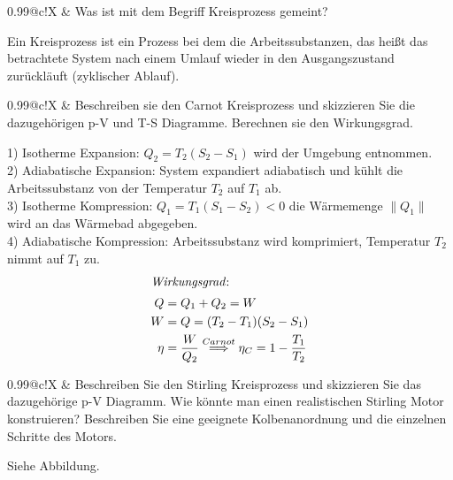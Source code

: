 \documentclass[a4paper,12pt]{scrartcl}
\makeatletter
\newcounter{qc}\setcounter{qc}{1}
\newenvironment{fshaded}{
\def\FrameCommand{\fcolorbox{framecolor}{shadecolor}}
\MakeFramed {\FrameRestore}}
{\endMakeFramed}
\def\frage#1{
\begin{fshaded}
\noindent
\begin{tabularx}{0.99\textwidth}{@{}c!{\color{framecolor}\vline}X}
{ \bf \rm \theqc }	&	\noindent #1
\end{tabularx}
\stepcounter{qc}
\end{fshaded}
}
\makeatother
\begin{document}
\frage{Was ist mit dem Begriff Kreisprozess gemeint?}
\noindent
Ein Kreisprozess ist ein Prozess bei dem die Arbeitssubstanzen, das heißt das betrachtete System nach einem Umlauf wieder 
in den Ausgangszustand zurückläuft (zyklischer Ablauf). 

\frage{Beschreiben sie den Carnot Kreisprozess und skizzieren Sie die dazugehörigen p-V und T-S Diagramme. Berechnen sie den Wirkungsgrad.}
\noindent
	1) Isotherme Expansion: $Q_2=T_2(S_2-S_1)$ wird der Umgebung entnommen.\\
	2) Adiabatische Expansion: System expandiert adiabatisch und kühlt die Arbeitssubstanz von der Temperatur $T_2$ auf $T_1$ 
ab.\\
	3) Isotherme Kompression: $Q_1=T_1(S_1-S_2)<0$ die Wärmemenge $\|Q_1\|$ wird an das Wärmebad abgegeben.\\
	4) Adiabatische Kompression: Arbeitssubstanz wird komprimiert, Temperatur $T_2$ nimmt auf $T_1$ zu.\\
	\begin{align*}
		\intertext{\textit{Wirkungsgrad}:}Q&=Q_1+Q_2=W\\
		W&=Q=(T_2-T_1)(S_2-S_1)\\
		\eta&=\frac{W}{Q_2} \stackrel{Carnot}{\Longrightarrow}\eta_C=1-\frac{T_1}{T_2}\\
	\end{align*}

\frage{Beschreiben Sie den Stirling Kreisprozess und skizzieren Sie das dazugehörige p-V Diagramm. Wie könnte man einen 
realistischen Stirling Motor konstruieren? Beschreiben Sie eine geeignete Kolbenanordnung und die
einzelnen Schritte des Motors.}
\noindent
Siehe Abbildung.
\end{document}
